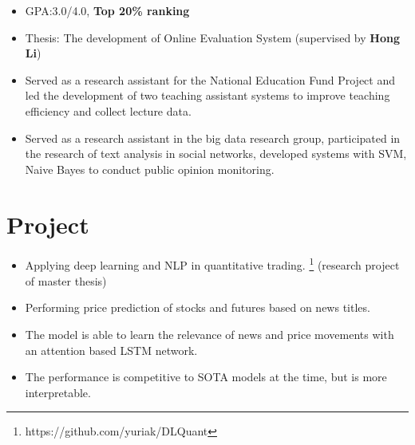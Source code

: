 \documentclass{resume_en}
\begin{document}
\begin{itemize}
    \item GPA:3.0/4.0, \textbf{Top 20\% ranking}
    \item Thesis: The development of Online Evaluation System (supervised by \textbf{Hong Li})
    \item Served as a research assistant for the National Education Fund Project and led the development of two teaching assistant systems to improve teaching efficiency and collect lecture data.
    \item Served as a research assistant in the big data research group, participated in the research of text analysis in social networks, developed systems with SVM, Naive Bayes to conduct public opinion monitoring.
\end{itemize}

\section{Project}

\begin{itemize}
    \item Applying deep learning and NLP in quantitative trading. \footnote{https://github.com/yuriak/DLQuant} (research project of master thesis)
    \item Performing price prediction of stocks and futures based on news titles.
    \item The model is able to learn the relevance of news and price movements with an attention based LSTM network.
    \item The performance is competitive to SOTA models at the time, but is more interpretable.
\end{itemize}
\end{document}
